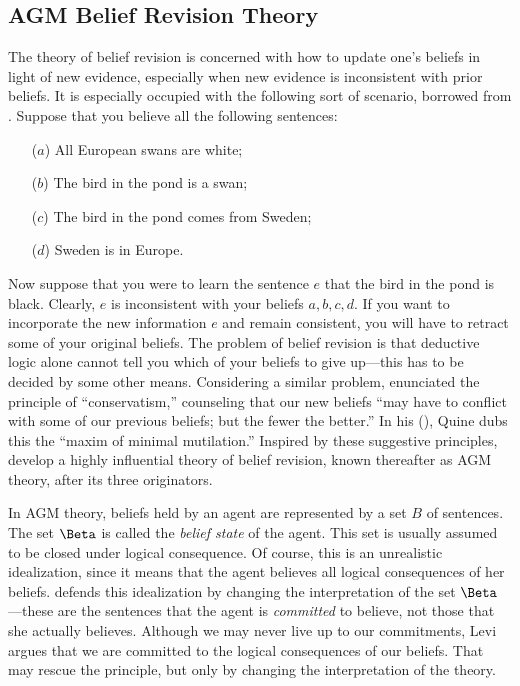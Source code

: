 \subsection{AGM Belief Revision Theory}
The theory of belief revision is concerned with how to update one's beliefs in
light of new evidence, especially when new evidence is inconsistent with prior
beliefs. It is especially occupied with the following sort of scenario, borrowed
from \citet{gardenfors1992beliefrevision}. Suppose that you believe all the
following sentences:
\begin{itemize}
\item[($a$)] All European swans are white;
\item[($b$)] The bird in the pond is a swan;
\item[($c$)] The bird in the pond comes from Sweden;
\item[($d$)] Sweden is in Europe. 
\end{itemize}
Now suppose that you were to learn the sentence $e$ that the bird in the pond is
black. Clearly, $e$ is inconsistent with your beliefs $a,b,c,d$. If you want to
incorporate the new information $e$ and remain consistent, you will have to
retract some of your original beliefs. The problem of belief revision is that
deductive logic alone cannot tell you which of your beliefs to give up---this
has to be decided by some other means. Considering a similar problem,
\citet*{quine1970web} enunciated the principle of ``conservatism,'' counseling
that our new beliefs ``may have to conflict with some of our previous beliefs;
but the fewer the better.'' In his (), Quine
dubs this the ``maxim of minimal mutilation.'' Inspired by these suggestive
principles, \citet*{alchourron1985logic} develop a highly influential theory of
belief revision, known thereafter as AGM theory, after its three originators.

In AGM theory, beliefs held by an agent are represented by a set $B$ of
sentences. The set $\Beta$ is called the {\em belief state} of the agent. This
set is usually assumed to be closed under logical consequence. Of course, this
is an unrealistic idealization, since it means that the agent believes all
logical consequences of her beliefs. \citet{levi1991fixation} defends this
idealization by changing the interpretation of the set $\Beta$---these are the
sentences that the agent is {\em committed} to believe, not those that she
actually believes. Although we may never live up to our commitments, Levi argues
that we are committed to the logical consequences of our beliefs. That may
rescue the principle, but only by changing the interpretation of the theory.

